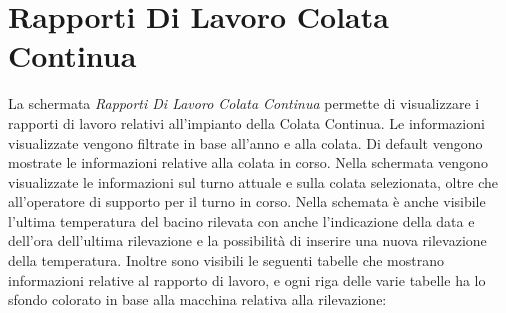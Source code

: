   \section{Rapporti Di Lavoro Colata Continua}
  La schermata \textit{Rapporti Di Lavoro Colata Continua} permette di visualizzare
  i rapporti di lavoro relativi all'impianto della Colata Continua. Le informazioni visualizzate vengono filtrate in base
  all'anno e alla colata. Di default vengono mostrate le informazioni relative alla colata in corso. Nella schermata vengono
  visualizzate le informazioni sul turno attuale e sulla colata selezionata, oltre che all'operatore di supporto per il turno
  in corso. Nella schemata è anche visibile l'ultima temperatura del bacino rilevata con anche l'indicazione 
  della data e dell'ora dell'ultima rilevazione e la possibilità di inserire una nuova rilevazione della temperatura.
  Inoltre sono visibili le seguenti tabelle che mostrano informazioni relative al rapporto di lavoro, e ogni riga delle varie
  tabelle ha lo sfondo colorato in base alla macchina relativa alla rilevazione:
